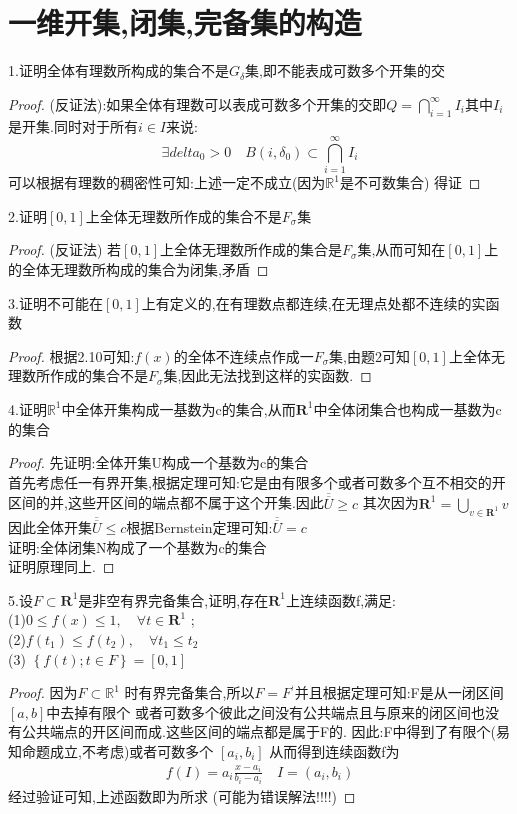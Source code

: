 \section{一维开集,闭集,完备集的构造}
1.证明全体有理数所构成的集合不是\(G_{\delta}\)集,即不能表成可数多个开集的交
\begin{proof}
  (反证法):如果全体有理数可以表成可数多个开集的交即\(Q= \bigcap\limits_{i=1}^{\infty} I_i\)其中\(I_i\)是开集.同时对于所有\(i \in I\)来说: 
  \[\exists delta_0 >0 \quad B(i,\delta_0) \subset \bigcap\limits_{i=1}^{\infty} I_i \]
  可以根据有理数的稠密性可知:上述一定不成立(因为\(\mathbb{R}^1 \)是不可数集合)
  得证
\end{proof}
2.证明\([0,1]\)上全体无理数所作成的集合不是\(F_{\sigma}\)集
\begin{proof}
  (反证法) 
  若\([0,1]\)上全体无理数所作成的集合是\(F_{\sigma}\)集,从而可知在\([0,1]\)上的全体无理数所构成的集合为闭集,矛盾
\end{proof}
3.证明不可能在\([0,1]\)上有定义的,在有理数点都连续,在无理点处都不连续的实函数
\begin{proof}
  根据2.10可知:\(f(x)\)的全体不连续点作成一\(F_{\sigma}\)集,由题2可知\([0,1]\)上全体无理数所作成的集合不是\(F_{\sigma}\)集,因此无法找到这样的实函数. 
\end{proof}
4.证明\(\mathbb{R}^1 \)中全体开集构成一基数为c的集合,从而\(\mathbf{R}^1 \)中全体闭集合也构成一基数为c的集合
\begin{proof}
 先证明:全体开集U构成一个基数为c的集合 \\ 
  首先考虑任一有界开集,根据定理可知:它是由有限多个或者可数多个互不相交的开区间的并,这些开区间的端点都不属于这个开集.因此\(\overline{\overline{U}} \geq c \)
  其次因为\(\mathbf{R}^1=\bigcup\limits_{v \in \mathbf{R}^1}v\)
  因此全体开集\(\overline{\overline{U}}\leq c \)根据Bernstein定理可知:\(\overline{\overline{U}}= c \)
  \\ 
  证明:全体闭集N构成了一个基数为c的集合
  \\
  证明原理同上. 
\end{proof}
5.设\(F \subset \mathbf{R}^1 \)是非空有界完备集合,证明,存在\(\mathbf{R}^1 \)上连续函数f,满足:\\
(1)\(0\leq f(x)\leq 1 ,\quad \forall t \in \mathbf{R}^1 \) ;\\
(2)\(f(t_1) \leq f(t_2) ,\quad \forall t_1 \leq t_2\)
\\
(3) \(\left\{f(t); t\in F\right\} = [0,1]\)
\begin{proof}
  因为\(F\subset \mathbb{R}^1 \) 时有界完备集合,所以\(F = F^{‘}\)并且根据定理可知:F是从一闭区间\([a,b]\)中去掉有限个
  或者可数多个彼此之间没有公共端点且与原来的闭区间也没有公共端点的开区间而成.这些区间的端点都是属于F的.
  因此:F中得到了有限个(易知命题成立,不考虑)或者可数多个 \([a_i,b_i]\) 从而得到连续函数f为 \begin{align*}
    f(I) =  a_i\frac{x -a_i}{b_i-a_i} \quad I = (a_i ,b_i)
  \end{align*}
  经过验证可知,上述函数即为所求 (可能为错误解法!!!!)
\end{proof}
